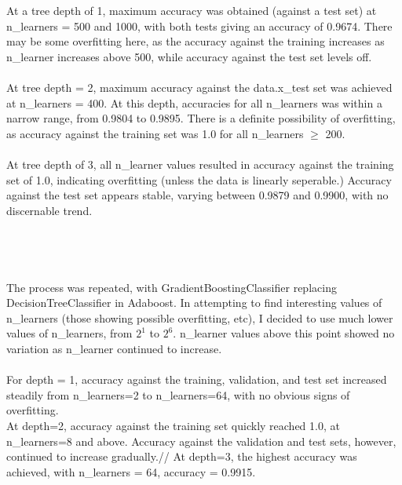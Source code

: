 \documentclass[11pt, oneside]{article}   	%
\begin{document}
At a tree depth of 1, maximum accuracy was obtained (against a test set) at n\_learners = 500 and 1000, with both tests giving an accuracy of 0.9674.  There may be some overfitting here, as the accuracy against the training increases as n\_learner increases above 500, while accuracy against the test set levels off.\\\\
At tree depth = 2, maximum accuracy against the data.x\_test set was achieved at n\_learners = 400.  At this depth, accuracies for all n\_learners was within a narrow range, from 0.9804 to 0.9895.  There is a definite possibility of overfitting, as accuracy against the training set was 1.0 for all n\_learners $\geq$ 200.\\\\
At tree depth of 3, all n\_learner values resulted in accuracy against the training set of 1.0, indicating overfitting (unless the data is linearly seperable.)  Accuracy against the test set appears stable, varying between 0.9879 and 0.9900, with no discernable trend.\\\\\\\\\\
\indent The process was repeated, with GradientBoostingClassifier replacing DecisionTreeClassifier in Adaboost.  In attempting to find interesting values of n\_learners (those showing possible overfitting, etc), I decided to use much lower values of n\_learners, from $2^1$ to $2^6$.  n\_learner values above this point showed no variation as n\_learner continued to increase.\\
\\
\indent For depth = 1, accuracy against the training, validation, and test set increased steadily from n\_learners=2 to n\_learners=64, with no obvious signs of overfitting.\\
\indent At depth=2, accuracy against the training set quickly reached 1.0, at n\_learners=8 and above.  Accuracy against the validation and test sets, however, continued to increase gradually.//
\indent At depth=3, the highest accuracy was achieved, with n\_learners = 64, accuracy = 0.9915.
\end{document}
